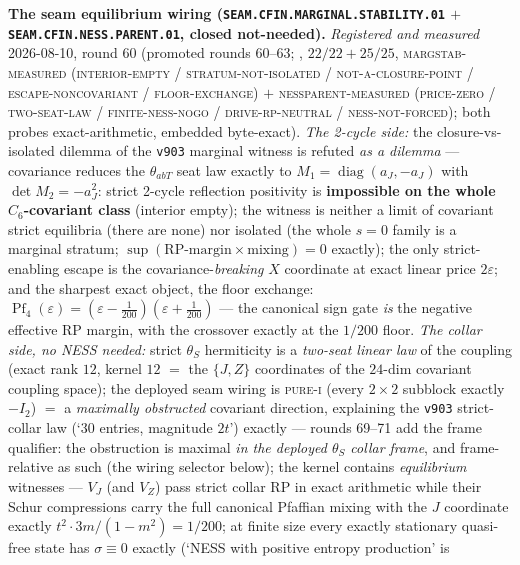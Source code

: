 \par\smallskip\noindent\textbf{The seam equilibrium wiring
(\texttt{SEAM.CFIN.MARGINAL.\allowbreak STABILITY.01} $+$
\texttt{SEAM.CFIN.NESS.\allowbreak PARENT.01}, closed
not-needed).}
{\sloppy
\emph{Registered and measured} 2026-08-10, round 60 (promoted
rounds 60--63; ,
$22/22 + 25/25$, \textsc{margstab-measured (interior-empty /
stratum-not-isolated / not-a-closure-point /
escape-noncovariant / floor-exchange)} $+$
\textsc{nessparent-measured (price-zero / two-seat-law /
finite-ness-nogo / drive-rp-neutral / ness-not-forced)}; both
probes exact-arithmetic, embedded byte-exact).
\emph{The 2-cycle side:} the closure-vs-isolated dilemma of the
\texttt{v903} marginal witness is refuted \emph{as a dilemma}
--- covariance reduces the $\theta_{abT}$ seat law exactly to
$M_1 = \operatorname{diag}(a_J, -a_J)$ with
$\det M_2 = -a_J^2$: strict 2-cycle reflection positivity is
\textbf{impossible on the whole $C_6$-covariant class}
(interior empty); the witness is neither a limit of covariant
strict equilibria (there are none) nor isolated (the whole
$s = 0$ family is a marginal stratum;
$\sup(\text{RP-margin} \times \text{mixing}) = 0$ exactly); the
only strict-enabling escape is the covariance-\emph{breaking}
$X$ coordinate at exact linear price $2\varepsilon$; and the
sharpest exact object, the floor exchange:
$\operatorname{Pf}_4(\varepsilon) = (\varepsilon -
\tfrac1{200})(\varepsilon + \tfrac1{200})$ --- the canonical
sign gate \emph{is} the negative effective RP margin, with the
crossover exactly at the $1/200$ floor.  \emph{The collar side,
no NESS needed:} strict $\theta_S$ hermiticity is a
\emph{two-seat linear law} of the coupling (exact rank $12$,
kernel $12$ $=$ the $\{J, Z\}$ coordinates of the $24$-dim
covariant coupling space); the deployed seam wiring is
\textsc{pure-i} (every $2\times2$ subblock exactly $-I_2$) $=$
a \emph{maximally obstructed} covariant direction, explaining
the \texttt{v903} strict-collar law (`$30$ entries, magnitude
$2t$') exactly --- rounds 69--71 add the frame qualifier: the
obstruction is maximal \emph{in the deployed $\theta_S$ collar
frame}, and frame-relative as such (the wiring selector below);
the kernel contains \emph{equilibrium}
witnesses --- $V_J$ (and $V_Z$) pass strict collar RP in exact
arithmetic while their Schur compressions carry the full
canonical Pfaffian mixing with the $J$ coordinate exactly
$t^2 \cdot 3m/(1-m^2) = 1/200$; at finite size every exactly
stationary quasi-free state has $\sigma \equiv 0$ exactly
(`NESS with positive entropy production' is
}
